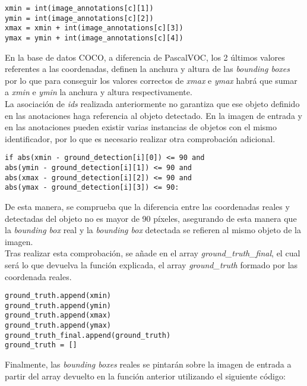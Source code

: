\documentclass[a4paper, 12pt, oneside]{book}
\begin{document}
\begin{lstlisting}[frame=single]
xmin = int(image_annotations[c][1])
ymin = int(image_annotations[c][2])
xmax = xmin + int(image_annotations[c][3])
ymax = ymin + int(image_annotations[c][4])
\end{lstlisting}

En la base de datos COCO, a diferencia de PascalVOC, los 2 últimos valores referentes a las coordenadas, definen la anchura y altura de las \textit{bounding boxes} por lo que para conseguir los valores correctos de \textit{xmax} e \textit{ymax} habrá que sumar a \textit{xmin} e \textit{ymin} la anchura y altura respectivamente.\\

La asociación de \textit{ids} realizada anteriormente no garantiza que ese objeto definido en las anotaciones haga referencia al objeto detectado. En la imagen de entrada y en las anotaciones pueden existir varias instancias de objetos con el mismo identificador, por lo que es necesario realizar otra comprobación adicional.\\

\begin{lstlisting}[frame=single]
if abs(xmin - ground_detection[i][0]) <= 90 and
abs(ymin - ground_detection[i][1]) <= 90 and
abs(xmax - ground_detection[i][2]) <= 90 and
abs(ymax - ground_detection[i][3]) <= 90:
\end{lstlisting}

De esta manera, se comprueba que la diferencia entre las coordenadas reales y detectadas del objeto no es mayor de 90 píxeles, asegurando de esta manera que la \textit{bounding box} real y la \textit{bounding box} detectada se refieren al mismo objeto de la imagen.\\

Tras realizar esta comprobación, se añade en el array \textit{ground\_truth\_final}, el cual será lo que devuelva la función explicada, el array \textit{ground\_truth} formado por las coordenada reales.\\

\begin{lstlisting}[frame=single]
ground_truth.append(xmin)
ground_truth.append(ymin)
ground_truth.append(xmax)
ground_truth.append(ymax)
ground_truth_final.append(ground_truth)
ground_truth = []
\end{lstlisting}

Finalmente, las \textit{bounding boxes} reales se pintarán sobre la imagen de entrada a partir del array devuelto en la función anterior utilizando el siguiente código:\\
\end{document}

